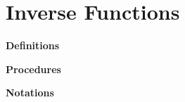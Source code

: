 \chapter{Inverse Functions}
\begin{genericFrame}[frametitle={~New Things\hbox{~}}]
    \textbf{\Large\sffamily Definitions}

    \noindent\textbf{\Large\sffamily Procedures}

    \noindent\textbf{\Large\sffamily Notations}
\end{genericFrame}
